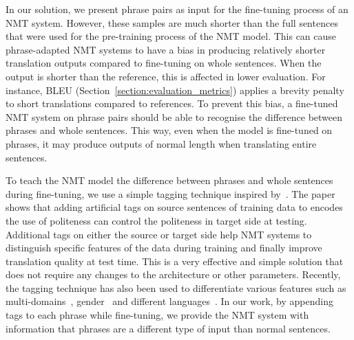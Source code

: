 In our solution, we present phrase pairs as input for the fine-tuning process of an NMT system. However, these samples are much shorter than the full sentences that were used for the pre-training process of the NMT model. This can cause phrase-adapted NMT systems to have a bias in producing relatively shorter translation outputs compared to fine-tuning on whole sentences. When the output is shorter than the reference, this is affected in lower evaluation. For instance, BLEU (Section~\ref{section:evaluation_metrics}) applies a brevity penalty to short translations compared to references.
To prevent this bias, a fine-tuned NMT system on phrase pairs should be able to recognise the difference between phrases and whole sentences. This way, even when the model is fine-tuned on phrases, it may produce outputs of normal length when translating entire sentences.

To teach the NMT model the difference between phrases and whole sentences during fine-tuning, we use a simple tagging technique inspired by~\cite{sennrich2016controlling}. 
The paper shows that adding artificial tags on source sentences of training data to encodes the use of politeness can control the politeness in target side at testing.
Additional tags on either the source or target side help NMT systems to distinguish specific features of the data during training and finally improve translation quality at test time. %
This is a very effective and simple solution that does not require any changes to the architecture or other parameters.
Recently, the tagging technique has also been used to differentiate various features such as multi-domains~\parencite{kobus-etal-2017-domain}, gender~\parencite{kuczmarski2018gender} and different languages~\parencite{johnson-etal-2017-googles}. In our work, by appending tags to each phrase while fine-tuning, we provide the NMT system with information that phrases are a different type of input than normal sentences.



